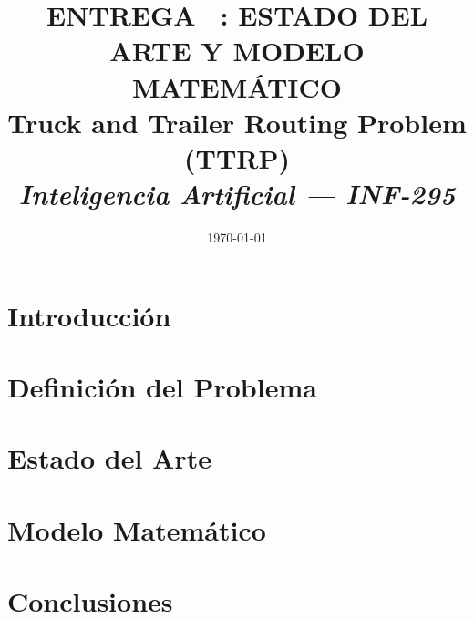\documentclass[11pt,spanish]{article}
\author{\namestudent}
\title{
  \huge
  \textbf{ENTREGA \tnum~: ESTADO DEL ARTE Y MODELO MATEMÁTICO} \\[1ex]
  \Large \textbf{Truck and Trailer Routing Problem (TTRP)} \\[1ex]
  \large \emph{Inteligencia Artificial --- INF-295}
}
\date{
  \small
  \today
}
\begin{document}
\maketitle
\thispagestyle{fancy}
\vspace{-1.0\baselineskip}



\section{Introducción}


\section{Definición del Problema}


\section{Estado del Arte}


\section{Modelo Matemático}


\section{Conclusiones}


\printbibliography[title={Referencias Bibliográficas}]
\end{document}
